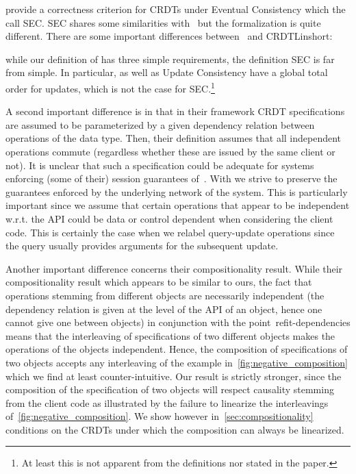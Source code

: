 
\citet{JagadeesanR18} provide a correctness criterion for CRDTs under
Eventual Consistency which the call SEC.
%
SEC shares some similarities with~\cite{PerrinMJ14} but the
formalization is quite different.
There are some important differences between~\cite{JagadeesanR18} and
CRDTLinshort{}:
\begin{inparaenum}
\item while our definition of \CRDTLin{} has three simple
  requirements, the definition SEC is far from simple.
  In particular, \CRDTLin{} as well as Update Consistency have a
  global total order for updates, which is not the case for
  SEC.\footnote{At least this is not apparent from the definitions nor
    stated in the paper.}
\item
  \label{it-dependencies}
  A second important difference is in that in their framework CRDT
  specifications are assumed to be parameterized by a given dependency
  relation between operations of the data type.
  Then, their definition assumes that all independent operations
  commute (regardless whether these are issued by the same client or
  not).
  It is unclear that such a specification could be adequate for
  systems enforcing (some of their) session guarantees
  of~\cite{TerryDPSTW94}.
  With \CRDTLin{} we strive to preserve the guarantees enforced by the
  underlying network of the system.
  This is particularly important since we assume that certain
  operations that appear to be independent w.r.t. the API could be
  data or control dependent when considering the client code.
  This is certainly the case when we relabel query-update operations
  since the query usually provides arguments for the subsequent
  update.
\item Another important difference concerns their compositionality
  result.
  While their compositionality result which appears to be similar to
  ours, the fact that operations stemming from different objects are
  necessarily independent (the dependency relation is given at the level
  of the API of an object, hence one cannot give one between objects) in
  conjunction with the point~ref{it-dependencies} means that the
  interleaving of specifications of two different objects makes the
  operations of the objects independent.
  Hence, the composition of specifications of two objects accepts any
  interleaving of the example in~\autoref{fig:negative_composition}
  which we find at least counter-intuitive.
  Our result is strictly stronger, since the composition of the
  specification of two objects will respect causality stemming from
  the client code as illustrated by the failure to linearize the
  interleavings of~\autoref{fig:negative_composition}.
  We show however in~\autoref{sec:compositionality} conditions on the
  CRDTs under which the composition can always be linearized.
\end{inparaenum}

